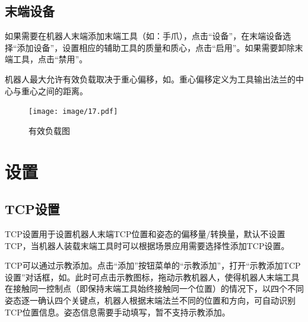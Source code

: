 \subsection{末端设备}
\label{sec:末端设备}
如果需要在机器人末端添加末端工具（如：手爪），点击“设备”，在末端设备选择“添加设备”，设置相应的辅助工具的质量和质心，点击“启用”。如果需要卸除末端工具，点击“禁用”。

机器人最大允许有效负载取决于重心偏移，如。重心偏移定义为工具输出法兰的中心与重心之间的距离。

\begin{figure}[ht]
	\centering
	\texttt{[image: image/17.pdf]}
	\caption{有效负载图}
	\label{fig:有效负载图}
\end{figure}


\section{设置}
\subsection{TCP设置}
TCP设置用于设置机器人末端TCP位置和姿态的偏移量/转换量，默认不设置TCP，当机器人装载末端工具时可以根据场景应用需要选择性添加TCP设置。

TCP可以通过示教添加。点击“添加”按钮菜单的“示教添加”，打开“示教添加TCP设置”对话框，如。此时可点击示教图标，拖动示教机器人，使得机器人末端工具在接触同一控制点（即保持末端工具始终接触同一个位置）的情况下，以四个不同姿态逐一确认四个关键点，机器人根据末端法兰不同的位置和方向，可自动识别TCP位置信息。姿态信息需要手动填写，暂不支持示教添加。


